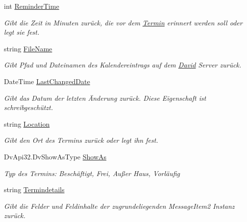 \begin{DoxyCompactItemize}
int \hyperlink{class_products_1_1_model_1_1_entities_1_1_termin_adbc2d192f3a06c8d91851aed87ff1a2b}{Reminder\+Time}
\begin{DoxyCompactList}\small\item\em Gibt die Zeit in Minuten zurück, die vor dem \hyperlink{class_products_1_1_model_1_1_entities_1_1_termin}{Termin} erinnert werden soll oder legt sie fest. \end{DoxyCompactList}\item 
string \hyperlink{class_products_1_1_model_1_1_entities_1_1_termin_af5082db794f278084cc03c556d00c203}{File\+Name}
\begin{DoxyCompactList}\small\item\em Gibt Pfad und Dateinamen des Kalendereintrags auf dem \hyperlink{namespace_david}{David} Server zurück. \end{DoxyCompactList}\item 
Date\+Time \hyperlink{class_products_1_1_model_1_1_entities_1_1_termin_aac86b9a1605e58e84d3af10fa0014376}{Last\+Changed\+Date}
\begin{DoxyCompactList}\small\item\em Gibt das Datum der letzten Änderung zurück. Diese Eigenschaft ist schreibgeschützt. \end{DoxyCompactList}\item 
string \hyperlink{class_products_1_1_model_1_1_entities_1_1_termin_a91ae1fabab7673a590fb0fac439ec822}{Location}
\begin{DoxyCompactList}\small\item\em Gibt den Ort des Termins zurück oder legt ihn fest. \end{DoxyCompactList}\item 
Dv\+Api32.\+Dv\+Show\+As\+Type \hyperlink{class_products_1_1_model_1_1_entities_1_1_termin_a707233dc8fee37b697ede7bd39879fc4}{Show\+As}
\begin{DoxyCompactList}\small\item\em Typ des Termins\+: Beschäftigt, Frei, Außer Haus, Vorläufig \end{DoxyCompactList}\item 
string \hyperlink{class_products_1_1_model_1_1_entities_1_1_termin_a5a2ef29d3a9249ed680756af2181a742}{Termindetails}
\begin{DoxyCompactList}\small\item\em Gibt die Felder und Feldinhalte der zugrundeliegenden Message\+Item2 Instanz zurück. \end{DoxyCompactList}\end{DoxyCompactItemize}


